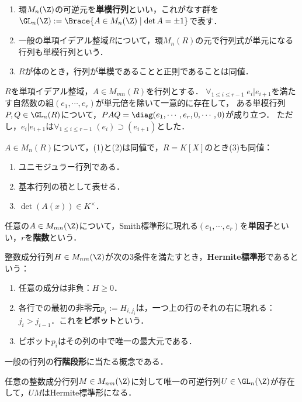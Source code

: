 \documentclass[uplatex, dvipdfmx]{jsreport}
\begin{document}
\begin{definition}[unimodular]\mbox{}
    \begin{enumerate}
        \item 環$M_n(\Z)$の可逆元を\textbf{単模行列}といい，これがなす群を$\GL_n(\Z):=\Brace{A\in M_n(\Z)\mid\det A=\pm1}$で表す．
        \item  一般の単項イデアル整域$R$について，環$M_n(R)$の元で行列式が単元になる行列も単模行列という．
        \item $R$が体のとき，行列が単模であることと正則であることは同値．
    \end{enumerate}
\end{definition}

\begin{theorem}
    $R$を単項イデアル整域，$A\in M_{mn}(R)$を行列とする．
    $\forall_{1\le i\le r-1}\;e_i|e_{i+1}$を満たす自然数の組$(e_1,\cdots,e_r)$が単元倍を除いて一意的に存在して，
    ある単模行列$P,Q\in\GL_n(R)$について，$PAQ=\diag(e_1,\cdots,e_r,0,\cdots,0)$が成り立つ．
    ただし，$e_i|e_{i+1}$は$\forall_{1\le i\le r-1}\;(e_i)\supset(e_{i+1})$とした．
\end{theorem}
\begin{corollary}[ユニモジュラー行列の特徴付け]
    $A\in M_n(R)$について，(1)と(2)は同値で，$R=K[X]$のとき(3)も同値：
    \begin{enumerate}
        \item ユニモジュラー行列である．
        \item 基本行列の積として表せる．
        \item $\det(A(x))\in K^\times$．
    \end{enumerate}
\end{corollary}
\begin{definition}
    任意の$A\in M_{mn}(\Z)$について，Smith標準形に現れる$(e_1,\cdots,e_r)$を\textbf{単因子}といい，$r$を\textbf{階数}という．
\end{definition}

\begin{definition}
    整数成分行列$H\in M_{nm}(\Z)$が次の3条件を満たすとき，\textbf{Hermite標準形}であるという：
    \begin{enumerate}
        \item 任意の成分は非負：$H\ge0$．
        \item 各行での最初の非零元$p_i:=H_{i,j_i}$は，一つ上の行のそれの右に現れる：$j_i>j_{i-1}$．これを\textbf{ピボット}という．
        \item ピボット$p_i$はその列の中で唯一の最大元である．
    \end{enumerate}
    一般の行列の\textbf{行階段形}に当たる概念である．
\end{definition}
\begin{theorem}
    任意の整数成分行列$M\in M_{nm}(\Z)$に対して唯一の可逆行列$U\in\GL_n(\Z)$が存在して，$UM$はHermite標準形になる．
\end{theorem}
\end{document}
